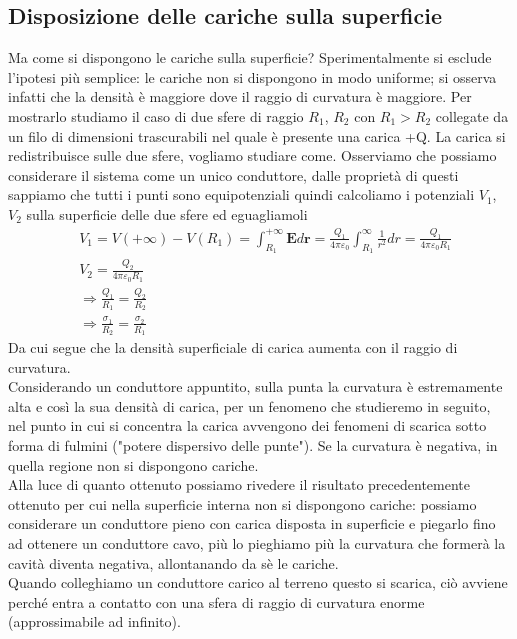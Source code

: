 \documentclass[10pt,a4paper]{article}
\begin{document}
\subsection{Disposizione delle cariche sulla superficie}
Ma come si dispongono le cariche sulla superficie? Sperimentalmente si esclude l'ipotesi più semplice: le cariche non si dispongono in modo uniforme; si osserva infatti che la densità è maggiore dove il raggio di curvatura è maggiore. Per mostrarlo studiamo il caso di due sfere di raggio \(R_1\), \(R_2\) con \(R_1>R_2\) collegate da un filo di dimensioni trascurabili nel quale è presente una carica +Q. La carica si redistribuisce sulle due sfere, vogliamo studiare come. Osserviamo che possiamo considerare il sistema come un unico conduttore, dalle proprietà di questi sappiamo che tutti i punti sono equipotenziali quindi calcoliamo i potenziali \(V_1\), \(V_2\) sulla superficie delle due sfere ed eguagliamoli
\begin{align*}
	&V_1 = V(+\infty) - V(R_1) = \int_{R_1}^{+\infty} \mathbf{E}d\mathbf{r} =  \frac{Q_1}{4\pi\varepsilon_0}\int_{R_1}^{\infty}\frac{1}{r^2}dr = \frac{Q_1}{4\pi\varepsilon_0R_1} \\
	&V_2 = \frac{Q_2}{4\pi\varepsilon_0R_1}\\
	&\Rightarrow \frac{Q_1}{R_1}= \frac{Q_2}{R_2}\\
	&\Rightarrow \frac{\sigma_1}{R_2} = \frac{\sigma_2}{R_1}
\end{align*}
Da cui segue che la densità superficiale di carica aumenta con il raggio di curvatura.\\
Considerando un conduttore appuntito, sulla punta la curvatura è estremamente alta e così la sua densità di carica, per un fenomeno che studieremo in seguito, nel punto in cui si concentra la carica avvengono dei fenomeni di scarica sotto forma di fulmini ("potere dispersivo delle punte"). Se la curvatura è negativa, in quella regione non si dispongono cariche.\\
Alla luce di quanto ottenuto possiamo rivedere il risultato precedentemente ottenuto per cui nella superficie interna non si dispongono cariche: possiamo considerare un conduttore pieno con carica disposta in superficie e piegarlo fino ad ottenere un conduttore cavo, più lo pieghiamo più la curvatura che formerà la cavità diventa negativa, allontanando da sè le cariche.\\
Quando colleghiamo un conduttore carico al terreno questo si scarica, ciò avviene perché entra a contatto con una sfera di raggio di curvatura enorme (approssimabile ad infinito). 
\end{document}
